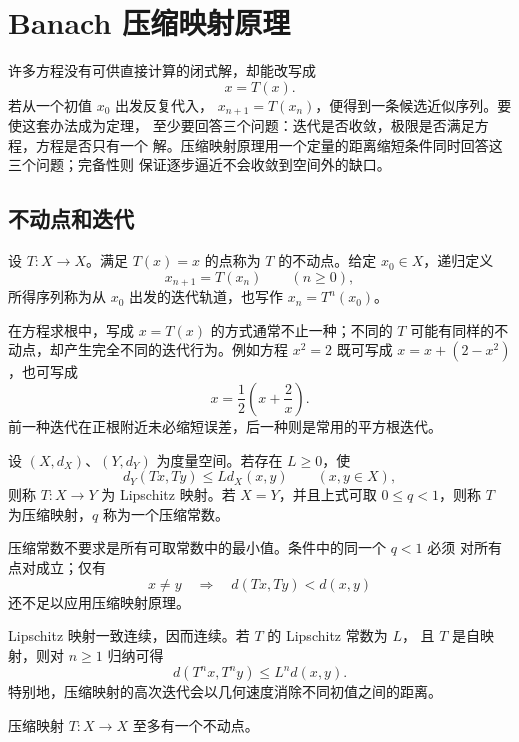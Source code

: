 \chapter{Banach 压缩映射原理}
\label{chap:banach-contraction}

许多方程没有可供直接计算的闭式解，却能改写成
\[
 x=T(x).
\]
若从一个初值 \(x_0\) 出发反复代入，
\(x_{n+1}=T(x_n)\)，便得到一条候选近似序列。要使这套办法成为定理，
至少要回答三个问题：迭代是否收敛，极限是否满足方程，方程是否只有一个
解。压缩映射原理用一个定量的距离缩短条件同时回答这三个问题；完备性则
保证逐步逼近不会收敛到空间外的缺口。

\section{不动点和迭代}

\begin{definition}[不动点与迭代轨道]
设 \(T:X\to X\)。满足 \(T(x)=x\) 的点称为 \(T\) 的不动点。给定
\(x_0\in X\)，递归定义
\[
 x_{n+1}=T(x_n)\qquad(n\ge0),
\]
所得序列称为从 \(x_0\) 出发的迭代轨道，也写作 \(x_n=T^n(x_0)\)。
\end{definition}

在方程求根中，写成 \(x=T(x)\) 的方式通常不止一种；不同的 \(T\)
可能有同样的不动点，却产生完全不同的迭代行为。例如方程 \(x^2=2\)
既可写成 \(x=x+(2-x^2)\)，也可写成
\[
 x=\frac12\left(x+\frac2x\right).
\]
前一种迭代在正根附近未必缩短误差，后一种则是常用的平方根迭代。

\begin{definition}
设 \((X,d_X)\)、\((Y,d_Y)\) 为度量空间。若存在 \(L\ge0\)，使
\[
 d_Y(Tx,Ty)\le Ld_X(x,y)\qquad(x,y\in X),
\]
则称 \(T:X\to Y\) 为 Lipschitz 映射。若 \(X=Y\)，并且上式可取
\(0\le q<1\)，则称 \(T\) 为压缩映射，\(q\) 称为一个压缩常数。
\end{definition}

压缩常数不要求是所有可取常数中的最小值。条件中的同一个 \(q<1\) 必须
对所有点对成立；仅有
\[
 x\ne y\quad\Longrightarrow\quad d(Tx,Ty)<d(x,y)
\]
还不足以应用压缩映射原理。

Lipschitz 映射一致连续，因而连续。若 \(T\) 的 Lipschitz 常数为 \(L\)，
且 \(T\) 是自映射，则对 \(n\ge1\) 归纳可得
\[
 d(T^nx,T^ny)\le L^n d(x,y).
\]
特别地，压缩映射的高次迭代会以几何速度消除不同初值之间的距离。

\begin{proposition}[压缩映射至多有一个不动点]
\label{prop:contraction-fixed-point-unique}
压缩映射 \(T:X\to X\) 至多有一个不动点。
\end{proposition}

